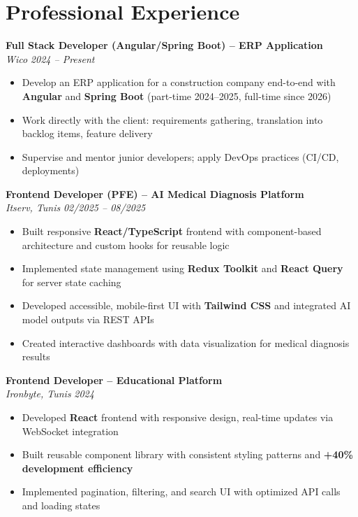 \documentclass[10pt,a4paper]{article}
\begin{document}
\vspace{6pt}

\section*{Professional Experience}
{\small

\textbf{Full Stack Developer (Angular/Spring Boot) -- ERP Application}\\[1pt]
\textit{Wico} \hfill \textit{2024 -- Present}
\begin{itemize}
  \item Develop an ERP application for a construction company end-to-end with \textbf{Angular} and \textbf{Spring Boot} (part-time 2024--2025, full-time since 2026)
  \item Work directly with the client: requirements gathering, translation into backlog items, feature delivery
  \item Supervise and mentor junior developers; apply DevOps practices (CI/CD, deployments)
\end{itemize}

\vspace{3pt}
\textbf{Frontend Developer (PFE) -- AI Medical Diagnosis Platform}\\[1pt]
\textit{Itserv, Tunis} \hfill \textit{02/2025 -- 08/2025}
\begin{itemize}
  \item Built responsive \textbf{React/TypeScript} frontend with component-based architecture and custom hooks for reusable logic
  \item Implemented state management using \textbf{Redux Toolkit} and \textbf{React Query} for server state caching
  \item Developed accessible, mobile-first UI with \textbf{Tailwind CSS} and integrated AI model outputs via REST APIs
  \item Created interactive dashboards with data visualization for medical diagnosis results
\end{itemize}

\vspace{3pt}
\textbf{Frontend Developer -- Educational Platform}\\[1pt]
\textit{Ironbyte, Tunis} \hfill \textit{2024}
\begin{itemize}
  \item Developed \textbf{React} frontend with responsive design, real-time updates via WebSocket integration
  \item Built reusable component library with consistent styling patterns and \textbf{+40\% development efficiency}
  \item Implemented pagination, filtering, and search UI with optimized API calls and loading states
\end{itemize}

}
\end{document}
